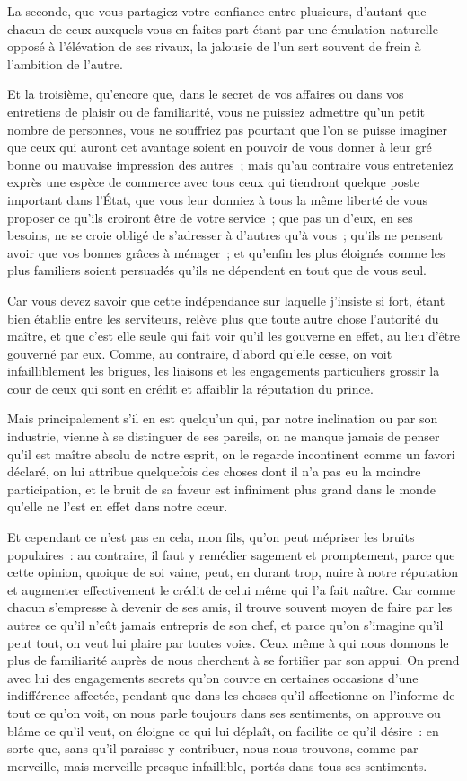 \documentclass[french,twoside]{book} %
\begin{document}
La seconde, que vous partagiez votre confiance entre plusieurs, d’autant que chacun de ceux auxquels vous en faites part étant par une émulation naturelle opposé à l’élévation de ses rivaux, la jalousie de l’un sert souvent de frein à l’ambition de l’autre.\par
Et la troisième, qu’encore que, dans le secret de vos affaires ou dans vos entretiens de plaisir ou de familiarité, vous ne puissiez admettre qu’un petit nombre de personnes, vous ne souffriez pas pourtant que l’on se puisse imaginer que ceux qui auront cet avantage soient en pouvoir de vous donner à leur gré bonne ou mauvaise impression des autres ; mais qu’au contraire vous entreteniez exprès une espèce de commerce avec tous ceux qui tiendront quelque poste important dans l’État, que vous leur donniez à tous la même liberté de vous proposer ce qu’ils croiront être de votre service ; que pas un d’eux, en ses besoins, ne se croie obligé de s’adresser à d’autres qu’à vous ; qu’ils ne pensent avoir que vos bonnes grâces à ménager ; et qu’enfin les plus éloignés comme les plus familiers soient persuadés qu’ils ne dépendent en tout que de vous seul.\par
Car vous devez savoir que cette indépendance sur laquelle j’insiste si fort, étant bien établie entre les serviteurs, relève plus que toute autre chose l’autorité du maître, et que c’est elle seule qui fait voir qu’il les gouverne en effet, au lieu d’être gouverné par eux. Comme, au contraire, d’abord qu’elle cesse, on voit infailliblement les brigues, les liaisons et les engagements particuliers grossir la cour de ceux qui sont en crédit et affaiblir la réputation du prince.\par
Mais principalement s’il en est quelqu’un qui, par notre inclination ou par son industrie, vienne à se distinguer de ses pareils, on ne manque jamais de penser qu’il est maître absolu de notre esprit, on le regarde incontinent comme un favori déclaré, on lui attribue quelquefois des choses dont il n’a pas eu la moindre participation, et le bruit de sa faveur est infiniment plus grand dans le monde qu’elle ne l’est en effet dans notre cœur.\par
Et cependant ce n’est pas en cela, mon fils, qu’on peut mépriser les bruits populaires : au contraire, il faut y remédier sagement et promptement, parce que cette opinion, quoique de soi vaine, peut, en durant trop, nuire à notre réputation et augmenter effectivement le crédit de celui même qui l’a fait naître. Car comme chacun s’empresse à devenir de ses amis, il trouve souvent moyen de faire par les autres ce qu’il n’eût jamais entrepris de son chef, et parce qu’on s’imagine qu’il peut tout, on veut lui plaire par toutes voies. Ceux même à qui nous donnons le plus de familiarité auprès de nous cherchent à se fortifier par son appui. On prend avec lui des engagements secrets qu’on couvre en certaines occasions d’une indifférence affectée, pendant que dans les choses qu’il affectionne on l’informe de tout ce qu’on voit, on nous parle toujours dans ses sentiments, on approuve ou blâme ce qu’il veut, on éloigne ce qui lui déplaît, on facilite ce qu’il désire : en sorte que, sans qu’il paraisse y contribuer, nous nous trouvons, comme par merveille, mais merveille presque infaillible, portés dans tous ses sentiments.\par
\end{document}
